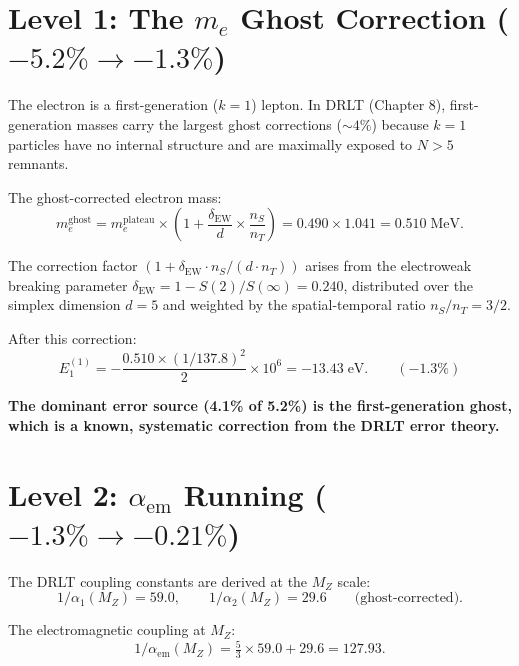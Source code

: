 \documentclass[12pt]{article}
\theoremstyle{remark}
\begin{document}
\section{Level 1: The $m_e$ Ghost Correction ($-5.2\% \to -1.3\%$)}

The electron is a first-generation ($k = 1$) lepton. In DRLT (Chapter 8), first-generation masses carry the largest ghost corrections ($\sim 4\%$) because $k = 1$ particles have no internal structure and are maximally exposed to $N > 5$ remnants.

The ghost-corrected electron mass:
\begin{equation}
m_e^\text{ghost} = m_e^\text{plateau} \times \left(1 + \frac{\delta_\text{EW}}{d} \times \frac{n_S}{n_T}\right) = 0.490 \times 1.041 = 0.510\;\text{MeV}.
\end{equation}

The correction factor $(1 + \delta_\text{EW} \cdot n_S/(d \cdot n_T))$ arises from the electroweak breaking parameter $\delta_\text{EW} = 1 - S(2)/S(\infty) = 0.240$, distributed over the simplex dimension $d = 5$ and weighted by the spatial-temporal ratio $n_S/n_T = 3/2$.

After this correction:
\begin{equation}
E_1^{(1)} = -\frac{0.510 \times (1/137.8)^2}{2} \times 10^6 = -13.43\;\text{eV}. \qquad (-1.3\%)
\end{equation}

\textbf{The dominant error source (4.1\% of 5.2\%) is the first-generation ghost, which is a known, systematic correction from the DRLT error theory.}

\section{Level 2: $\alpha_\text{em}$ Running ($-1.3\% \to -0.21\%$)}

The DRLT coupling constants are derived at the $M_Z$ scale:
\begin{equation}
1/\alpha_1(M_Z) = 59.0, \qquad 1/\alpha_2(M_Z) = 29.6 \qquad \text{(ghost-corrected)}.
\end{equation}

The electromagnetic coupling at $M_Z$:
\begin{equation}
1/\alpha_\text{em}(M_Z) = \tfrac{5}{3} \times 59.0 + 29.6 = 127.93.
\end{equation}
\end{document}
